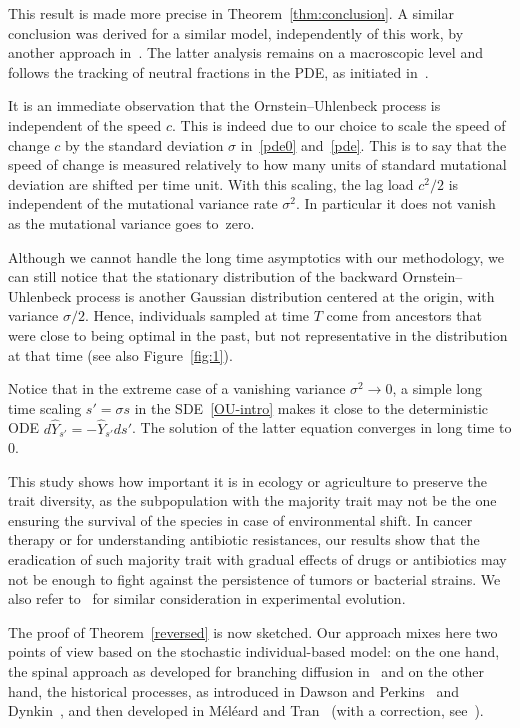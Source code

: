 \documentclass[AHL,Unicode,longabstracts,published]{cedram}
\begin{document}
This result is made more precise in Theorem~\ref{thm:conclusion}. A similar conclusion was derived for a similar model, independently of this work, by another approach in~\cite{ForienGarnierPatout}. The latter analysis remains on a macroscopic level and follows the tracking of neutral fractions in the PDE, as initiated in~\cite{Roquesetal}. 

It is an immediate observation that the Ornstein--Uhlenbeck process is independent of the speed $c$. This is indeed due to our choice to scale the speed of change $c$ by the standard deviation $\sigma$ in~\eqref{pde0} and~\eqref{pde}. This is to say that the speed of change is measured relatively to how many units of standard mutational deviation are shifted per time unit. With this scaling, the lag load $c^2/2$ is independent of the mutational variance rate $\sigma^2$. In particular it does not vanish as the mutational variance goes to~zero. 


Although we cannot handle the long time asymptotics with our methodology, we can still notice that the stationary distribution of the backward Ornstein--Uhlenbeck process is another Gaussian distribution centered at the origin, with variance $\sigma/2$. Hence, individuals sampled at time $T$ come from ancestors that were close to being optimal in the past, but not representative in the distribution at that time (see also Figure~\ref{fig:1}).



Notice that in the extreme case of a vanishing variance $\sigma^2\to 0$, a simple long time scaling $s' = \sigma s$ in the SDE~\eqref{OU-intro} makes it close to the deterministic ODE $d\widehat{Y}_{s'}=- \widehat{Y}_{s'}ds'$. The solution of the latter equation converges in long time to 0.


This study shows how important it is in ecology or agriculture to preserve the trait diversity, as the subpopulation with the majority trait may not be the one ensuring the survival of the species in case of environmental shift. In cancer therapy or for understanding antibiotic resistances, our results show that the eradication of such majority trait with gradual effects of drugs or antibiotics may not be enough to fight against the persistence of tumors or bacterial strains. We also refer to~\cite{guzella_slower_2018} for similar consideration in experimental evolution.



The proof of Theorem~\ref{reversed} is now sketched. Our approach mixes here two points of view based on the stochastic individual-based model: on the one hand, the spinal approach as developed for branching diffusion in~\cite{bansaye_limit_2011,hardyharris3,harrisroberts2011,Marguet1,Marguet2} and on the other hand, the historical processes, as introduced in Dawson and Perkins~\cite{dawsonperkinsAMS,perkinsAMS,perkins} and Dynkin~\cite{dynkin91}, and then developed in Méléard and Tran~\cite{meleardtran_suphist} (with a correction, see~\cite{kliem,chihdr}).
\end{document}
